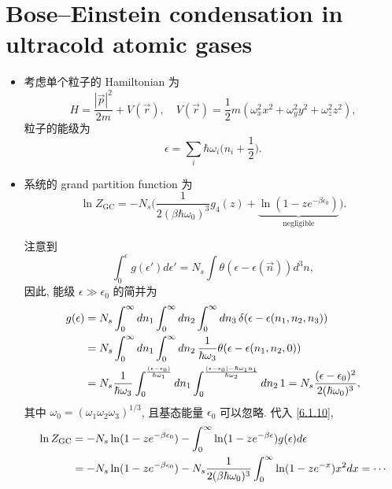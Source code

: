 \section{Bose--Einstein condensation in ultracold atomic gases} \label{7.2}
\begin{itemize}
	\item 考虑单个粒子的 Hamiltonian 为
	\begin{equation}
		H = \frac{|\vec{p}|^2}{2 m} + V(\vec{r}), \quad V(\vec{r}) = \frac{1}{2} m (\omega_x^2 x^2 + \omega_y^2 y^2 + \omega_z^2 z^2),
	\end{equation}
	粒子的能级为
	\begin{equation}
		\epsilon = \sum_i \hbar \omega_i \Big( n_i + \frac{1}{2} \Big).
	\end{equation}
	
	\item 系统的 grand partition function 为
	\begin{equation}
		\ln Z_\text{GC} = - N_s \Big( \frac{1}{2 (\beta \hbar \omega_0)^3} g_4(z) + \underbrace{\ln(1 - z e^{- \beta \epsilon_0})}_{\text{negligible}} \Big).
	\end{equation}
	
	\begin{tcolorbox}[title=calculation:]
		注意到
		\begin{equation}
			\int_0^\epsilon g(\epsilon') d\epsilon' = N_s \int \theta(\epsilon - \epsilon(\vec{n})) d^3 n,
		\end{equation}
		因此, 能级 $\epsilon \gg \epsilon_0$ 的简并为
		\begin{align}
			g(\epsilon) &= N_s \int_0^\infty dn_1 \int_0^\infty dn_2 \int_0^\infty dn_3 \, \delta(\epsilon - \epsilon(n_1, n_2, n_3)) \notag \\
			&= N_s \int_0^\infty dn_1 \int_0^\infty dn_2 \, \frac{1}{\hbar \omega_3} \theta(\epsilon - \epsilon(n_1, n_2, 0)) \notag \\
			&= N_s \frac{1}{\hbar \omega_3} \int_0^{\frac{(\epsilon - \epsilon_0)}{\hbar \omega_1}} dn_1 \int_0^{\frac{(\epsilon - \epsilon_0) - \hbar \omega_1 n_1}{\hbar \omega_2}} dn_2 \, 1 = N_s \frac{(\epsilon - \epsilon_0)^2}{2 (\hbar \omega_0)^3},
		\end{align}
		其中 $\omega_0 = (\omega_1 \omega_2 \omega_3)^{1 / 3}$, 且基态能量 $\epsilon_0$ 可以忽略. 代入 \eqref{6.1.10},
		\begin{align}
			\ln Z_\text{GC} &= - N_s \ln(1 - z e^{- \beta \epsilon_0}) - \int_0^\infty \ln(1 - z e^{- \beta \epsilon}) g(\epsilon) d\epsilon \notag \\
			&= - N_s \ln(1 - z e^{- \beta \epsilon_0}) - N_s \frac{1}{2 (\beta \hbar \omega_0)^3} \int_0^\infty \ln(1 - z e^{- x}) x^2 dx = \cdots
		\end{align}
	\end{tcolorbox}
	

\end{itemize}
